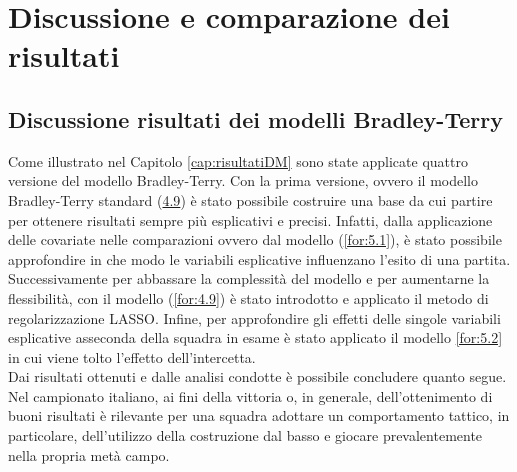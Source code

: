 
\chapter{Discussione e comparazione dei risultati}
\label{cap:risFin}
\section{Discussione risultati dei modelli Bradley-Terry}
Come illustrato nel Capitolo \ref{cap:risultatiDM} sono state applicate quattro versione del modello Bradley-Terry. Con la prima versione, ovvero il modello Bradley-Terry standard \autocite{bradley1952rank} (\hyperref[for:3.9]{4.9}) è stato possibile costruire una base da cui partire per ottenere risultati sempre più esplicativi e precisi. Infatti, dalla applicazione delle covariate nelle comparazioni ovvero dal modello (\ref{for:5.1}), è stato possibile approfondire in che modo le variabili esplicative influenzano l'esito di una partita. Successivamente per abbassare la complessità del modello e per aumentarne la flessibilità, con il modello (\ref{for:4.9}) è stato introdotto e applicato il metodo di regolarizzazione LASSO. Infine, per approfondire gli effetti delle singole variabili esplicative asseconda della squadra in esame è stato applicato il modello \ref{for:5.2} in cui viene tolto l'effetto dell'intercetta.\\
Dai risultati ottenuti e dalle analisi condotte è possibile concludere quanto segue. Nel campionato italiano, ai fini della vittoria o, in generale, dell'ottenimento di buoni risultati è rilevante per una squadra adottare un comportamento tattico, in particolare, dell'utilizzo della costruzione dal basso e giocare prevalentemente nella propria metà campo. 
